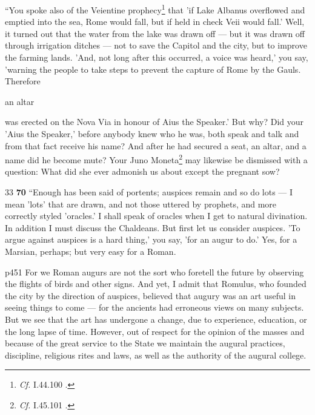 ``You spoke also of the Veientine prophecy\texthebrew{}\footnote{\emph{Cf.}
I.44.100 .

} that 'if Lake Albanus overflowed and emptied into the sea, Rome would fall, but if held in check Veii would fall.' Well, it turned out that the water from the lake was drawn off \texthebrew{—} but it was drawn off through irrigation ditches \texthebrew{—} not to save the Capitol and the city, but to improve the farming lands. 'And, not long after this occurred, a voice was heard,' you say, 'warning the people to take steps to prevent the capture of Rome by the Gauls. Therefore

an altar

was erected on the Nova Via in honour of Aius the Speaker.' But why? Did your 'Aius the Speaker,' before anybody knew who he was, both speak and talk and from that fact receive his name? And after he had secured a seat, an altar, and a name did he become mute? Your Juno Moneta\texthebrew{}\footnote{\emph{Cf.}
I.45.101 .

} may likewise be dismissed with a question: What did she ever admonish us about except the pregnant sow?

33
\textbf{70} ``Enough has been said of portents; auspices remain and so do lots \texthebrew{—} I mean 'lots' that are drawn, and not those uttered by prophets, and more correctly styled 'oracles.' I shall speak of oracles when I get to natural divination. In addition I must discuss the Chaldeans. But first let us consider auspices. 'To argue against auspices is a hard thing,' you say, 'for an augur to do.' Yes, for a Marsian, perhaps; but very easy for a Roman.

p451 For we Roman augurs are not the sort who foretell the future by observing the flights of birds and other signs. And yet, I admit that Romulus, who founded the city by the direction of auspices, believed that augury was an art useful in seeing things to come \texthebrew{—} for the ancients had erroneous views on many subjects. But we see that the art has undergone a change, due to experience, education, or the long lapse of time. However, out of respect for the opinion of the masses and because of the great service to the State we maintain the augural practices, discipline, religious rites and laws, as well as the authority of the augural college.

